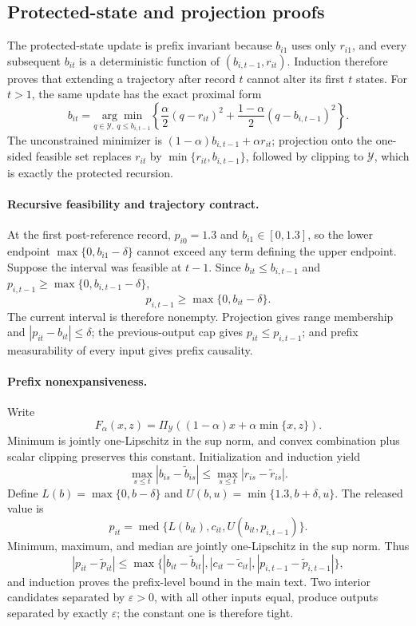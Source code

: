 \documentclass[11pt]{article}
\begin{document}
\subsection{Protected-state and projection proofs}

The protected-state update is prefix invariant because \(b_{i1}\) uses only \(r_{i1}\), and every subsequent \(b_{it}\) is a deterministic function of \((b_{i,t-1},r_{it})\). Induction therefore proves that extending a trajectory after record \(t\) cannot alter its first \(t\) states. For \(t>1\), the same update has the exact proximal form
\begin{equation}
 b_{it}=\underset{q\in\mathcal Y,\ q\leq b_{i,t-1}}{\arg\min}
 \left\{\frac{\alpha}{2}(q-r_{it})^2+
 \frac{1-\alpha}{2}(q-b_{i,t-1})^2\right\}.
 \label{eq:supp_protected_proximal}
\end{equation}
The unconstrained minimizer is \((1-\alpha)b_{i,t-1}+\alpha r_{it}\); projection onto the one-sided feasible set replaces \(r_{it}\) by \(\min\{r_{it},b_{i,t-1}\}\), followed by clipping to \(\mathcal Y\), which is exactly the protected recursion.

\paragraph{Recursive feasibility and trajectory contract.}
At the first post-reference record, \(p_{i0}=1.3\) and \(b_{i1}\in[0,1.3]\), so the lower endpoint \(\max\{0,b_{i1}-\delta\}\) cannot exceed any term defining the upper endpoint. Suppose the interval was feasible at \(t-1\). Since \(b_{it}\leq b_{i,t-1}\) and \(p_{i,t-1}\geq\max\{0,b_{i,t-1}-\delta\}\),
\[
 p_{i,t-1}\geq\max\{0,b_{it}-\delta\}.
\]
The current interval is therefore nonempty. Projection gives range membership and \(|p_{it}-b_{it}|\leq\delta\); the previous-output cap gives \(p_{it}\leq p_{i,t-1}\); and prefix measurability of every input gives prefix causality.

\paragraph{Prefix nonexpansiveness.}
Write
\[
 F_\alpha(x,z)=\Pi_{\mathcal Y}\!\left((1-\alpha)x+\alpha\min\{x,z\}\right).
\]
Minimum is jointly one-Lipschitz in the sup norm, and convex combination plus scalar clipping preserves this constant. Initialization and induction yield
\[
 \max_{s\leq t}|b_{is}-\widetilde b_{is}|
 \leq\max_{s\leq t}|r_{is}-\widetilde r_{is}|.
\]
Define \(L(b)=\max\{0,b-\delta\}\) and \(U(b,u)=\min\{1.3,b+\delta,u\}\). The released value is
\[
 p_{it}=\operatorname{med}\{L(b_{it}),c_{it},U(b_{it},p_{i,t-1})\}.
\]
Minimum, maximum, and median are jointly one-Lipschitz in the sup norm. Thus
\[
 |p_{it}-\widetilde p_{it}|
 \leq\max\{|b_{it}-\widetilde b_{it}|,
 |c_{it}-\widetilde c_{it}|,
 |p_{i,t-1}-\widetilde p_{i,t-1}|\},
\]
and induction proves the prefix-level bound in the main text. Two interior candidates separated by \(\varepsilon>0\), with all other inputs equal, produce outputs separated by exactly \(\varepsilon\); the constant one is therefore tight.
\end{document}
